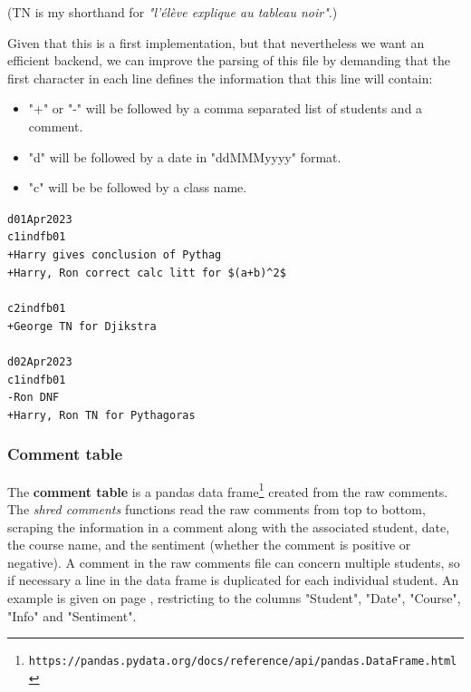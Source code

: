 \documentclass[10pt]{article}
\begin{document}
(TN is my shorthand for \emph{"l'élève explique au tableau noir"}.)


Given that this is a first implementation, but that nevertheless we want an efficient backend, we can improve the parsing of this file by demanding that the first character in each line defines the information that this line will contain:

\begin{itemize}
\item "+" or "-" will be followed by a comma separated list of students and a comment.
\item "d" will be followed by a date in "ddMMMyyyy" format.
\item "c" will be be followed by a class name.
\end{itemize}

\begin{tcolorbox}[title = comments\_file\_v1.1.txt]
\texttt{d01Apr2023\\c1indfb01\\+Harry gives conclusion of Pythag\\+Harry, Ron correct calc litt for \$(a+b)\textasciicircum2\$\\\\c2indfb01\\+George TN for Djikstra \\\\ d02Apr2023\\c1indfb01\\-Ron DNF\\+Harry, Ron TN for Pythagoras}
\end{tcolorbox}

\subsubsection{Comment table}

The \textbf{comment table} is a pandas data frame\footnote{\texttt{https://pandas.pydata.org/docs/reference/api/pandas.DataFrame.html}} created from the raw comments. The \emph{shred comments} functions read the raw comments from top to bottom, scraping the information in a comment along with the associated student, date, the course name, and the sentiment (whether the comment is positive or negative). A comment in the raw comments file can concern multiple students, so if necessary a line in the data frame is duplicated for each individual student. An example is given on page \pageref{comments_table}, restricting to the columns "Student", "Date", "Course", "Info" and "Sentiment".
\end{document}
